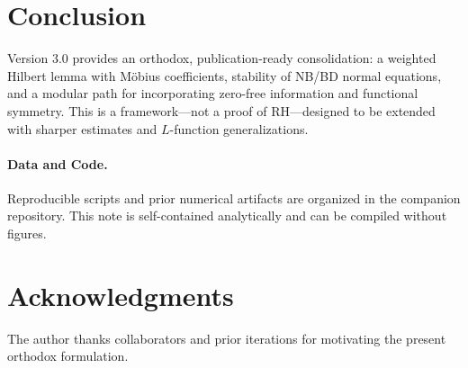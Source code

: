 \documentclass[12pt]{article}
\theoremstyle{remark}
\begin{document}
\section{Conclusion}
Version 3.0 provides an orthodox, publication-ready consolidation:
a weighted Hilbert lemma with M\"obius coefficients, stability of NB/BD normal equations,
and a modular path for incorporating zero-free information and functional symmetry.
This is a framework---not a proof of RH---designed to be extended with sharper estimates and $L$-function generalizations.

\paragraph{Data and Code.}
Reproducible scripts and prior numerical artifacts are organized in the companion repository.
This note is self-contained analytically and can be compiled without figures.

\section*{Acknowledgments}
The author thanks collaborators and prior iterations for motivating the present orthodox formulation.



\end{document}
